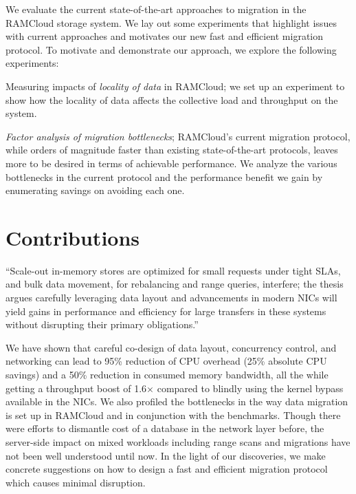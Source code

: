We evaluate the current state-of-the-art approaches to migration in the RAMCloud storage system.
We lay out some experiments that highlight issues with current approaches and motivates our new 
fast and efficient migration protocol. To motivate and demonstrate our approach, we explore
the following experiments:
\begin{myitemize}
\item Measuring impacts of {\em locality of data} in RAMCloud; we set up an experiment to show how 
the locality of data affects the collective load and throughput on the system.
\item {\em Factor analysis of migration bottlenecks}; RAMCloud's current migration protocol, while orders 
of magnitude faster than existing state-of-the-art protocols, leaves more to be desired in terms of achievable performance.
We analyze the various bottlenecks in the current protocol and the performance benefit we gain by enumerating savings on avoiding 
each one.
\end{myitemize} 

\section{Contributions}
\label{sec:contributions}
``Scale-out in-memory stores are optimized for small requests
under tight SLAs, and bulk data movement, for rebalancing and range queries, interfere;
the thesis argues \linebreak carefully leveraging data layout and advancements in modern NICs
will yield gains in performance and efficiency for large transfers in these systems
without disrupting their primary obligations.''
 
We have shown that careful co-design of data layout, concurrency control,
and \linebreak networking can lead to 95\% reduction of CPU overhead (25\% absolute CPU savings) and a 
50\% reduction in consumed memory bandwidth, all the while getting a throughput
boost of 1.6$\times$ compared to blindly using the kernel bypass available
in the NICs. We also profiled the bottlenecks in the way data migration is set up
in RAMCloud and in conjunction with the benchmarks. Though there were efforts to 
dismantle cost of a database in the network layer before, the server-side impact
on mixed workloads including range scans and migrations have not been well understood
until now. In the light of our discoveries, we make concrete suggestions on how
 to design a fast and efficient migration protocol which causes minimal disruption.

